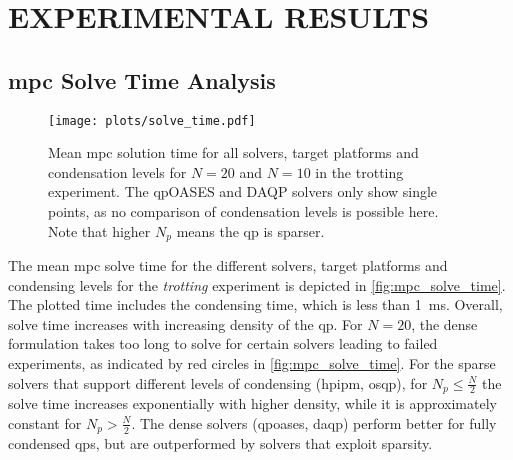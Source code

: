 \section{EXPERIMENTAL RESULTS}%
\label{sec:results}
\subsection{\gls{mpc} Solve Time Analysis}
\begin{figure*}[htbp]
\centering
\texttt{[image: plots/solve\_time.pdf]}
\caption{Mean \gls{mpc} solution time for all solvers, target platforms and condensation levels for $N=20$ and $N=10$ in the trotting experiment.  
The qpOASES and DAQP solvers only show single points, as no comparison of condensation levels is possible here. Note that higher $N_p$ means the \gls{qp} is sparser.}
\label{fig:mpc_solve_time}
\end{figure*}
The mean \gls{mpc} solve time for the different solvers, target platforms and condensing levels for the \textit{trotting} experiment is depicted in \autoref{fig:mpc_solve_time}. The plotted time includes the condensing time, which is less than \qty{1}{\milli\second}.
Overall, solve time increases with increasing density of the \gls{qp}. 
For $N=20$, the dense formulation takes too long to solve for certain solvers leading to failed experiments, as indicated by red circles in \autoref{fig:mpc_solve_time}.
For the sparse solvers that support different levels of condensing (\gls{hpipm}, \acrshort{osqp}),  for $N_p \leq \frac{N}{2}$ the solve time increases exponentially with higher density, while it is approximately constant for $N_p > \frac{N}{2}$. 
The dense solvers (\acrshort{qpoases}, \acrshort{daqp}) perform better for fully condensed \gls{qp}s, but are outperformed by solvers that exploit sparsity.
